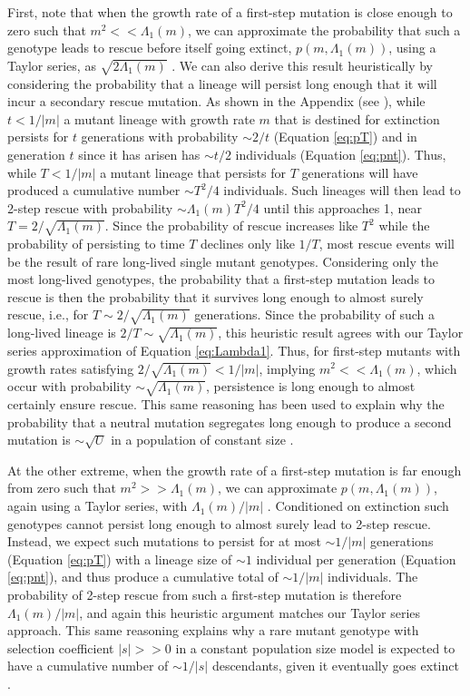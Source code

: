 \documentclass[9pt,twocolumn,twoside,lineno]{gsajnl}
\begin{document}
First, note that when the growth rate of a first-step mutation is close enough to zero such that $m^2 << \Lambda_1(m)$, we can approximate the probability that such a genotype leads to rescue before itself going extinct, $p(m,\Lambda_1(m))$, using a Taylor series, as $\sqrt{2\Lambda_1(m)}$ \citep[c.f.\ equation A.4b in][see also File S2]{Iwasa2004}.
We can also derive this result heuristically by considering the probability that a lineage will persist long enough that it will incur a secondary rescue mutation.
As shown in the Appendix (see ), while $t<1/|m|$ a mutant lineage with growth rate $m$ that is destined for extinction persists for $t$ generations with probability $\sim2/t$ (Equation \ref{eq:pT}) and in generation $t$ since it has arisen has $\sim t/2$ individuals (Equation \ref{eq:pnt}). 
Thus, while $T<1/|m|$ a mutant lineage that persists for $T$ generations will have produced a cumulative number $\sim T^2/4$ individuals. 
Such lineages will then lead to 2-step rescue with probability $\sim \Lambda_1(m) T^2/4$ until this approaches 1, near $T=2/\sqrt{\Lambda_1(m)}$.
Since the probability of rescue increases like $T^2$ while the probability of persisting to time $T$ declines only like $1/T$, most rescue events will be the result of rare long-lived single mutant genotypes.
Considering only the most long-lived genotypes, the probability that a first-step mutation leads to rescue is then the probability that it survives long enough to almost surely rescue, i.e., for $T\sim2/\sqrt{\Lambda_1(m)}$ generations.
Since the probability of such a long-lived lineage is $2/T \sim \sqrt{\Lambda_1(m)}$, this heuristic result agrees with our Taylor series approximation of Equation \ref{eq:Lambda1}.
Thus, for first-step mutants with growth rates satisfying $2/\sqrt{\Lambda_1(m)} < 1/|m|$, implying $m^2 << \Lambda_1(m)$, which occur with probability $\sim \sqrt{\Lambda_1(m)}$, persistence is long enough to almost certainly ensure rescue.
This same reasoning has been used to explain why the probability that a neutral mutation segregates long enough to produce a second mutation is $\sim\sqrt{U}$ in a population of constant size \citep{Weissman2009}.

At the other extreme, when the growth rate of a first-step mutation is far enough from zero such that $m^2 >> \Lambda_1(m)$, we can approximate $p(m,\Lambda_1(m))$, again using a Taylor series, with $\Lambda_1(m)/ |m|$ \citep[c.f.\ equation A.4c in][see also File S2]{Iwasa2004}.
Conditioned on extinction such genotypes cannot persist long enough to almost surely lead to 2-step rescue.
Instead, we expect such mutations to persist for at most $\sim1/|m|$ generations (Equation \ref{eq:pT}) with a lineage size of $\sim1$ individual per generation (Equation \ref{eq:pnt}), and thus produce a cumulative total of $\sim 1/|m|$ individuals. 
The probability of 2-step rescue from such a first-step mutation is therefore $\Lambda_1(m)/ |m|$, and again this heuristic argument matches our Taylor series approach.
This same reasoning explains why a rare mutant genotype with selection coefficient $|s|>>0$ in a constant population size model is expected to have a cumulative number of $\sim1/|s|$ descendants, given it eventually goes extinct \citep{Weissman2009}. 
\end{document}
